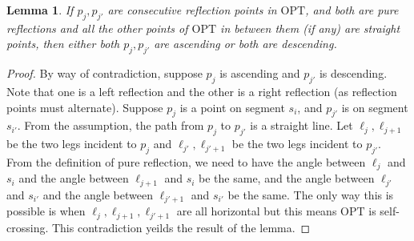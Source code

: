 \documentclass[10pt,a4paper]{amsart}
\theoremstyle{thmstyleone}
\newtheorem{lemma}{Lemma}
\newcommand{\OPT}{{\text{OPT}}}
\begin{document}
\begin{lemma}\label{lem:cons-ref}
    If $p_j,p_{j'}$ are consecutive reflection points in $\OPT$, and both are pure reflections  and all the other points of $\OPT$ in between them (if any) are straight points, then either both $p_j,p_{j'}$ are ascending or both are descending.
\end{lemma}
\begin{proof}
	By  way  of contradiction, suppose 
	$p_j$ is ascending and $p_{j'}$ is descending. Note that one is a left reflection and the other is a right reflection (as reflection points must alternate). Suppose $p_j$ is a point on segment $s_i$, and $p_{j'}$ is on segment $s_{i'}$. From the assumption, the path  from $p_j$ to $p_{j'}$ is a straight line.
	Let $\ell_j,\ell_{j+1}$ be the two legs incident to $p_j$ and $\ell_{j'},\ell_{j'+1}$ be the two legs incident to $p_{j'}$. From the definition of pure reflection, we need to have the angle between $\ell_j$ and $s_i$ and the angle between $\ell_{j+1}$ and $s_i$ be the same, and the angle between $\ell_{j'}$ and $s_{i'}$ and the angle between $\ell_{j'+1}$ and $s_{i'}$ be the same. The only way this is possible is when 
	$\ell_j,\ell_{j+1},\ell_{j'+1}$ are all horizontal but this means $\OPT$
	is self-crossing. This contradiction yeilds the result of the lemma.
\end{proof}
\end{document}
